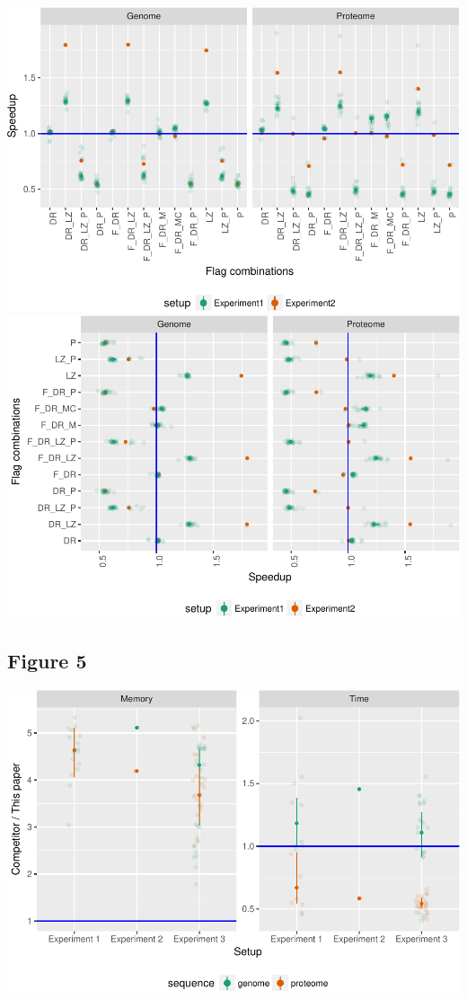 \documentclass[]{article}
\begin{document}
\includegraphics{sea_2018_files/figure-latex/fig4-1.pdf}
\includegraphics{sea_2018_files/figure-latex/fig4-2.pdf}

\subsection{Figure 5}\label{figure-5}

\includegraphics{sea_2018_files/figure-latex/fig5-1.pdf}
\end{document}
